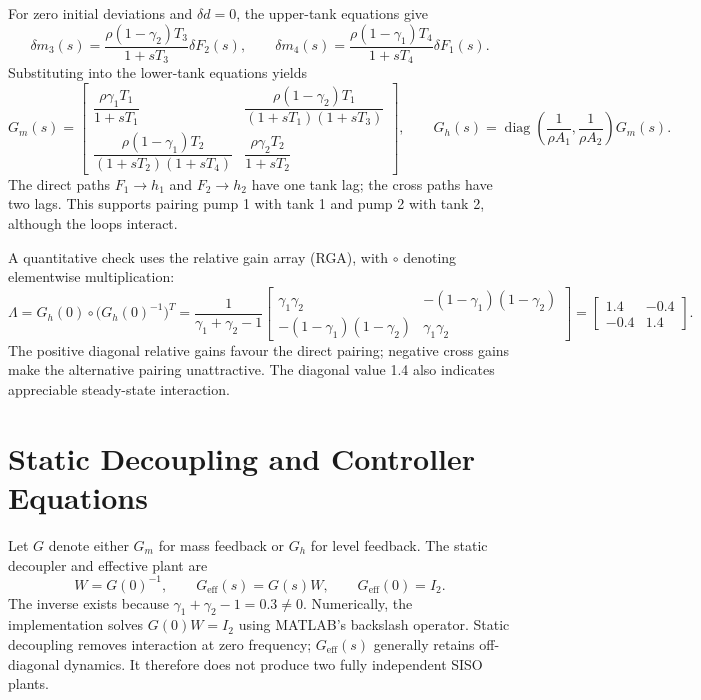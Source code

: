 For zero initial deviations and $\delta d=0$, the upper-tank equations give
\begin{equation}
 \delta m_3(s)=\frac{\rho(1-\gamma_2)T_3}{1+sT_3}\delta F_2(s),\qquad
 \delta m_4(s)=\frac{\rho(1-\gamma_1)T_4}{1+sT_4}\delta F_1(s).
\end{equation}
Substituting into the lower-tank equations yields
\begin{equation}
 G_m(s)=\begin{bmatrix}
 \dfrac{\rho\gamma_1T_1}{1+sT_1}&
 \dfrac{\rho(1-\gamma_2)T_1}{(1+sT_1)(1+sT_3)}\\[6pt]
 \dfrac{\rho(1-\gamma_1)T_2}{(1+sT_2)(1+sT_4)}&
 \dfrac{\rho\gamma_2T_2}{1+sT_2}
 \end{bmatrix},\qquad
 G_h(s)=\operatorname{diag}\left(\frac{1}{\rho A_1},
 \frac{1}{\rho A_2}\right)G_m(s).
 \label{eq:p3-transfer}
\end{equation}
The direct paths $F_1\to h_1$ and $F_2\to h_2$ have one tank lag;
the cross paths have two lags. This supports pairing pump 1 with tank 1
and pump 2 with tank 2, although the loops interact.

A quantitative check uses the relative gain array (RGA), with
$\circ$ denoting elementwise multiplication:
\begin{equation}
 \Lambda=G_h(0)\circ\bigl(G_h(0)^{-1}\bigr)^T
 =\frac{1}{\gamma_1+\gamma_2-1}
 \begin{bmatrix}
 \gamma_1\gamma_2&-(1-\gamma_1)(1-\gamma_2)\\
 -(1-\gamma_1)(1-\gamma_2)&\gamma_1\gamma_2
 \end{bmatrix}
 =\begin{bmatrix}1.4&-0.4\\-0.4&1.4\end{bmatrix}.
\end{equation}
The positive diagonal relative gains favour the direct pairing; negative
cross gains make the alternative pairing unattractive. The diagonal value
1.4 also indicates appreciable steady-state interaction.

\section{Static Decoupling and Controller Equations}

Let $G$ denote either $G_m$ for mass feedback or $G_h$ for level feedback.
The static decoupler and effective plant are
\begin{equation}
 W=G(0)^{-1},\qquad G_{\mathrm{eff}}(s)=G(s)W,\qquad
 G_{\mathrm{eff}}(0)=I_2.
 \label{eq:p3-decoupler}
\end{equation}
The inverse exists because $\gamma_1+\gamma_2-1=0.3\ne0$.
Numerically, the implementation solves $G(0)W=I_2$ using MATLAB's
backslash operator. Static decoupling removes interaction at zero
frequency; $G_{\mathrm{eff}}(s)$ generally retains off-diagonal dynamics.
It therefore does not produce two fully independent SISO plants.

